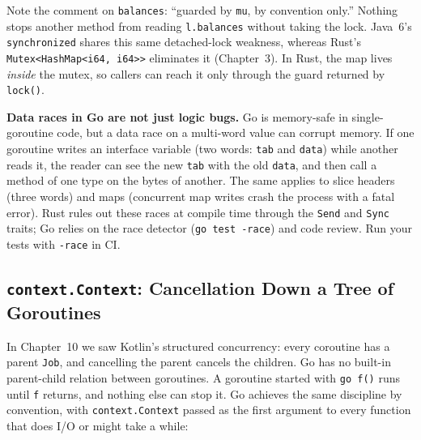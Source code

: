 Note the comment on \texttt{balances}: ``guarded by \texttt{mu}, by convention only.'' Nothing stops another method from reading \texttt{l.balances} without taking the lock. Java~6's \texttt{synchronized} shares this same detached-lock weakness, whereas Rust's \texttt{Mutex<HashMap<i64, i64>>} eliminates it (Chapter~3). In Rust, the map lives \emph{inside} the mutex, so callers can reach it only through the guard returned by \texttt{lock()}.

\begin{trapbox}
\textbf{Data races in Go are not just logic bugs.} Go is memory-safe in single-goroutine code, but a data race on a multi-word value can corrupt memory. If one goroutine writes an interface variable (two words: \texttt{tab} and \texttt{data}) while another reads it, the reader can see the new \texttt{tab} with the old \texttt{data}, and then call a method of one type on the bytes of another. The same applies to slice headers (three words) and maps (concurrent map writes crash the process with a fatal error). Rust rules out these races at compile time through the \texttt{Send} and \texttt{Sync} traits; Go relies on the race detector (\texttt{go test -race}) and code review. Run your tests with \texttt{-race} in CI.
\end{trapbox}

\subsection{\texttt{context.Context}: Cancellation Down a Tree of Goroutines}

In Chapter~10 we saw Kotlin's structured concurrency: every coroutine has a parent \texttt{Job}, and cancelling the parent cancels the children. Go has no built-in parent-child relation between goroutines. A goroutine started with \texttt{go f()} runs until \texttt{f} returns, and nothing else can stop it. Go achieves the same discipline by convention, with \texttt{context.Context} passed as the first argument to every function that does I/O or might take a while:

